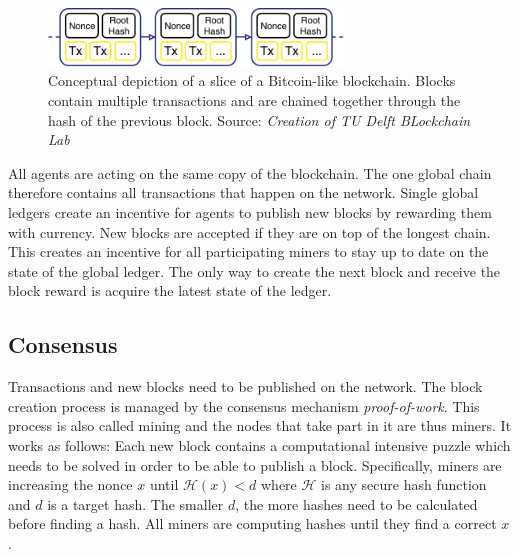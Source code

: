 \begin{figure}
    \centering
    \includegraphics[width=0.7\textwidth]{images/blockchain.pdf}
    \caption{Conceptual depiction of a slice of a Bitcoin-like blockchain. Blocks contain multiple transactions and are chained together through the hash of the previous block. Source: \textit{Creation of TU Delft BLockchain Lab}}
    \label{fig:basic_blockchain}
\end{figure}

All agents are acting on the same copy of the blockchain. The one global chain therefore contains 
all transactions that happen on the network. Single global ledgers create an incentive for agents to publish new blocks by rewarding 
them with currency. New blocks are accepted if they are on top of the longest chain. This creates 
an incentive for all participating miners to stay up to date on the state of the global ledger. The
only way to create the next block and receive the block reward is acquire the latest state of the ledger.



\subsection{Consensus}
Transactions and new blocks need to be published  on the network. The block creation process
is managed by the consensus mechanism \textit{proof-of-work}. This process is also called mining and the nodes
that take part in it are thus miners. It works as follows: Each new block contains a computational 
intensive puzzle which needs to be solved in order to be able to publish a block. Specifically, 
miners are increasing the nonce $x$ until $\mathcal{H}(x) < d$ where $\mathcal{H}$ is any secure hash
function and $d$ is a target hash. The smaller $d$, the more hashes need to be calculated before finding a hash.
All miners are computing hashes until they find a correct $x$. 

